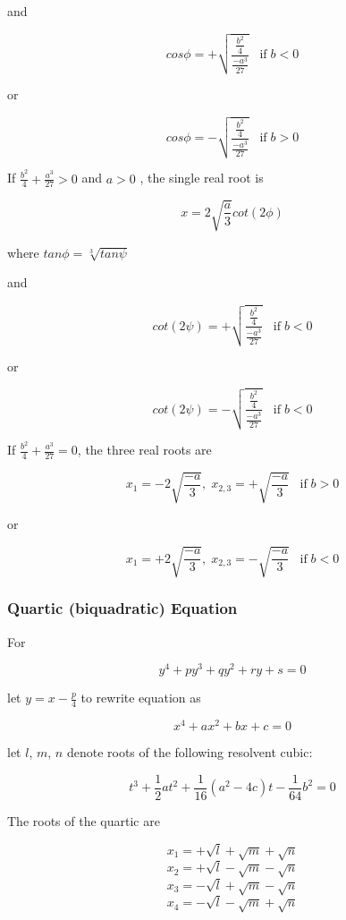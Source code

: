 \documentclass[
]{book}
\begin{document}
and

\[cos\phi = + \sqrt{\frac{ \frac{b^2}{4} }{ \frac{-a^3}{27} }} \;\;\;\text{if}\; b < 0\]

or

\[cos\phi = - \sqrt{\frac{ \frac{b^2}{4} }{ \frac{-a^3}{27} }} \;\;\;\text{if}\; b > 0\]

If \(\frac{b^2}{4} + \frac{a^3}{27} > 0\) and \(a > 0\) , the single real root is

\[x = 2 \sqrt{\frac{a}{3}} cot \left( 2\phi \right)\]

where \(tan\phi = \sqrt[3]{tan\psi}\)

and

\[ cot \left( 2\psi \right) = + \sqrt{\frac{ \frac{b^2}{4} }{ \frac{-a^3}{27} }} \;\;\;\text{if}\; b < 0\]

or

\[ cot \left( 2\psi \right) = - \sqrt{\frac{ \frac{b^2}{4} }{ \frac{-a^3}{27} }} \;\;\;\text{if}\; b < 0\]

If \(\frac{b^2}{4} + \frac{a^3}{27} = 0\), the three real roots are

\[ x_{1} = -2 \sqrt{\frac{-a}{3}}, \; x_{2,3} = +\sqrt{\frac{-a}{3}} \;\;\; \text{if} \; b > 0 \]

or

\[ x_{1} = +2 \sqrt{\frac{-a}{3}}, \; x_{2,3} = -\sqrt{\frac{-a}{3}} \;\;\; \text{if} \; b < 0 \]

\hypertarget{quartic-biquadratic-equation}{%
\subsubsection*{Quartic (biquadratic) Equation}\label{quartic-biquadratic-equation}}

For

\[y^4 + py^3 + qy^2 + ry + s = 0\]

let \(y = x - \frac{p}{4}\) to rewrite equation as

\[x^4 + ax^2 + bx + c = 0\]

let \(l\), \(m\), \(n\) denote roots of the following resolvent cubic:

\[ t^3 + \frac{1}{2} at^2 +  \frac{1}{16} \left( a^2 - 4c \right) t -  \frac{1}{64}b^2 = 0 \]

The roots of the quartic are

\[ x_{1} = + \sqrt{l} + \sqrt{m} + \sqrt{n} \]
\[ x_{2} = + \sqrt{l} - \sqrt{m} - \sqrt{n} \]
\[ x_{3} = - \sqrt{l} + \sqrt{m} - \sqrt{n} \]
\[ x_{4} = - \sqrt{l} - \sqrt{m} + \sqrt{n} \]
\end{document}
